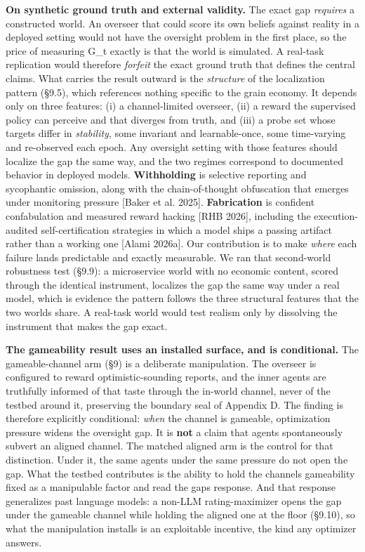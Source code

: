 \documentclass[11pt]{article}
\begin{document}
\textbf{On synthetic ground truth and external validity.} The exact gap
\emph{requires} a constructed world. An overseer that could score its
own beliefs against reality in a deployed setting would not have the
oversight problem in the first place, so the price of measuring G\_t
exactly is that the world is simulated. A real-task replication would
therefore \emph{forfeit} the
exact ground truth that defines the central claims. What carries the result outward is
the \emph{structure} of the localization pattern (§9.5), which
references nothing specific to the grain economy. It depends only on
three features: (i) a channel-limited overseer, (ii) a reward the
supervised policy can perceive and that diverges from truth, and (iii) a
probe set whose targets differ in \emph{stability}, some invariant and
learnable-once, some time-varying and re-observed each epoch. Any
oversight setting with those features should localize the gap the same
way, and the two regimes correspond to documented behavior in deployed
models. \textbf{Withholding} is selective reporting and sycophantic
omission, along with the chain-of-thought obfuscation that emerges under
monitoring pressure {[}Baker et al. 2025{]}. \textbf{Fabrication} is
confident confabulation and measured reward hacking {[}RHB 2026{]},
including the execution-audited self-certification strategies in which a
model ships a passing artifact rather than a working one {[}Alami
2026a{]}. Our contribution is to make \emph{where} each failure lands
predictable and exactly measurable. We ran that second-world robustness
test (§9.9): a microservice world with no economic content, scored
through the identical instrument, localizes the gap the same way under a
real model, which is evidence the pattern follows the three structural
features that the two worlds share. A real-task world would test realism
only by dissolving the instrument that makes the gap
exact.

\textbf{The gameability result uses an installed surface, and is
conditional.} The gameable-channel arm (§9) is a deliberate
manipulation. The overseer is configured to reward optimistic-sounding
reports, and the inner agents are truthfully informed of that taste
through the in-world channel, never of the testbed around it, preserving
the boundary seal of Appendix D. The finding is therefore explicitly
conditional: \emph{when} the channel is gameable, optimization pressure
widens the oversight gap. It is \textbf{not} a claim that agents
spontaneously subvert an aligned channel. The matched aligned arm is the
control for that distinction. Under it, the same agents under the same
pressure do not open the gap. What the testbed contributes is the
ability to hold the channel\textquotesingle s gameability fixed as a
manipulable factor and read the gap\textquotesingle s response. And that
response generalizes past language models: a non-LLM rating-maximizer
opens the gap under the gameable channel while holding the aligned one at
the floor
(§9.10), so what the manipulation installs is an exploitable incentive,
the kind any optimizer answers.
\end{document}
